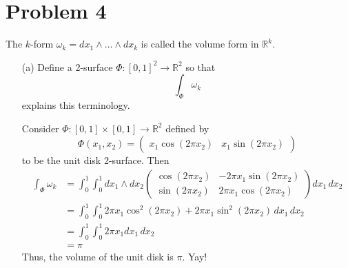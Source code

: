 \documentclass[11pt]{article}
\newcommand{\bbR}{\mathbb{R}}
\begin{document}
\newpage
\section*{Problem 4}
The \(k\)-form \(\omega_k = dx_1 \wedge \dots \wedge dx_k\) is called the volume form in \(\mathbb{R}^k\).

\begin{enumerate}
    \item[(a)] Define a 2-surface \(\Phi : [0, 1]^2 \to \mathbb{R}^2\) so that
    \[
    \int_{\Phi} \omega_k
    \]
    explains this terminology.
    \begin{solution}
        Consider $\Phi: [0,1] \times [0,1] \to \bbR^2$ defined by 
        \[\Phi(x_1, x_2) = \begin{pmatrix}
            x_1\cos(2\pi x_2) & x_1\sin(2\pi x_2)
        \end{pmatrix}\] to be the unit disk 2-surface. Then
        \begin{align*}
            \int_\Phi \omega_k &= \int_0^1\int_0^1 dx_1 \wedge dx_2 \begin{pmatrix}
                \cos(2\pi x_2) & -2\pi x_1\sin(2\pi x_2)\\
                \sin(2\pi x_2) & 2\pi x_1 \cos(2\pi x_2)
            \end{pmatrix} dx_1 \, dx_2\\
            &= \int_0^1\int_0^1 2\pi x_1\cos^2(2\pi x_2) + 2\pi x_1 \sin^2(2\pi x_2)\, dx_1\, dx_2\\
            &= \int_0^1 \int_0^1 2\pi x_1 dx_1 \, dx_2\\
            &= \pi
        \end{align*}
        Thus, the volume of the unit disk is $\pi.$ Yay!
    \end{solution}
    

\end{enumerate}
\end{document}
